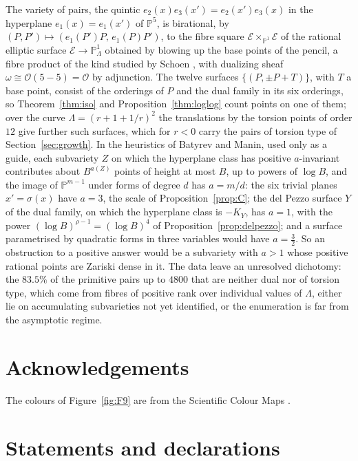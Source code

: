 \documentclass[11pt]{amsart}
\theoremstyle{definition}
\theoremstyle{remark}
\newcommand{\PP}{\mathbb{P}}
\begin{document}
The variety of pairs, the quintic $e_2(x)e_3(x')=e_2(x')e_3(x)$ in the hyperplane $e_1(x)=e_1(x')$ of $\PP^5$, is birational, by $(P,P')\mapsto(e_1(P')P,\,e_1(P)P')$, to the fibre square $\mathcal E\times_{\PP^1}\mathcal E$ of the rational elliptic surface $\mathcal E\to\PP^1_\Lambda$ obtained by blowing up the base points of the pencil, a fibre product of the kind studied by Schoen \cite{schoen1988}, with dualizing sheaf $\omega\cong\mathcal O(5-5)=\mathcal O$ by adjunction. The twelve surfaces $\{(P,\pm P+T)\}$, with $T$ a base point, consist of the orderings of $P$ and the dual family in its six orderings, so Theorem~\ref{thm:iso} and Proposition~\ref{thm:loglog} count points on one of them; over the curve $\Lambda=(r+1+1/r)^2$ the translations by the torsion points of order $12$ give further such surfaces, which for $r<0$ carry the pairs of torsion type of Section~\ref{sec:growth}. In the heuristics of Batyrev and Manin, used only as a guide, each subvariety $Z$ on which the hyperplane class has positive $a$-invariant contributes about $B^{a(Z)}$ points of height at most $B$, up to powers of $\log B$, and the image of $\PP^{m-1}$ under forms of degree $d$ has $a=m/d$: the six trivial planes $x'=\sigma(x)$ have $a=3$, the scale of Proposition~\ref{prop:C}; the del Pezzo surface $Y$ of the dual family, on which the hyperplane class is $-K_Y$, has $a=1$, with the power $(\log B)^{\rho-1}=(\log B)^4$ of Proposition~\ref{prop:delpezzo}; and a surface parametrised by quadratic forms in three variables would have $a=\frac32$. So an obstruction to a positive answer would be a subvariety with $a>1$ whose positive rational points are Zariski dense in it. The data leave an unresolved dichotomy: the $83.5\%$ of the primitive pairs up to $4800$ that are neither dual nor of torsion type, which come from fibres of positive rank over individual values of $\Lambda$, either lie on accumulating subvarieties not yet identified, or the enumeration is far from the asymptotic regime.


\section*{Acknowledgements}
The colours of Figure~\ref{fig:F9} are from the Scientific Colour Maps \cite{crameri2023,crameri2020}.

\section*{Statements and declarations}
\end{document}
